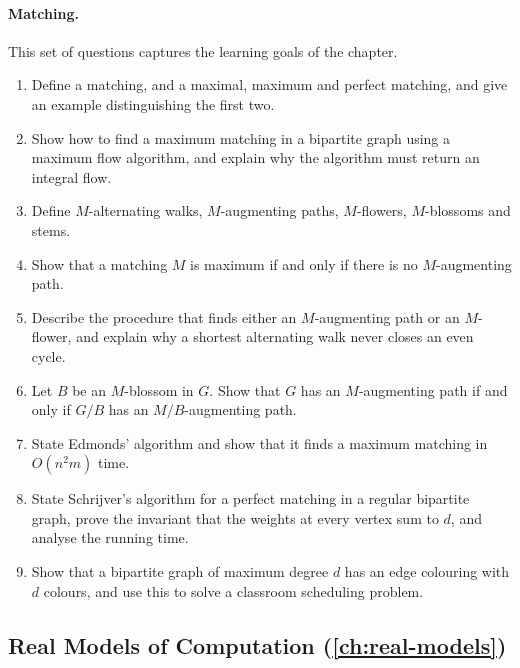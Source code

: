 \paragraph{Matching.}
This set of questions captures the learning goals of the chapter.
\begin{enumerate}
  \item Define a matching, and a maximal, maximum and perfect matching, and
        give an example distinguishing the first two.
  \item Show how to find a maximum matching in a bipartite graph using a
        maximum flow algorithm, and explain why the algorithm must return an
        integral flow.
  \item Define $M$-alternating walks, $M$-augmenting paths, $M$-flowers,
        $M$-blossoms and stems.
  \item Show that a matching $M$ is maximum if and only if there is no
        $M$-augmenting path.
  \item Describe the procedure that finds either an $M$-augmenting path or an
        $M$-flower, and explain why a shortest alternating walk never closes an
        even cycle.
  \item Let $B$ be an $M$-blossom in $G$. Show that $G$ has an $M$-augmenting
        path if and only if $G/B$ has an $M/B$-augmenting path.
  \item State Edmonds' algorithm and show that it finds a maximum matching in
        $O(n^2m)$ time.
  \item State Schrijver's algorithm for a perfect matching in a regular
        bipartite graph, prove the invariant that the weights at every vertex
        sum to $d$, and analyse the running time.
  \item Show that a bipartite graph of maximum degree $d$ has an edge colouring
        with $d$ colours, and use this to solve a classroom scheduling problem.
\end{enumerate}

\subsection*{Real Models of Computation (\cref{ch:real-models})}

